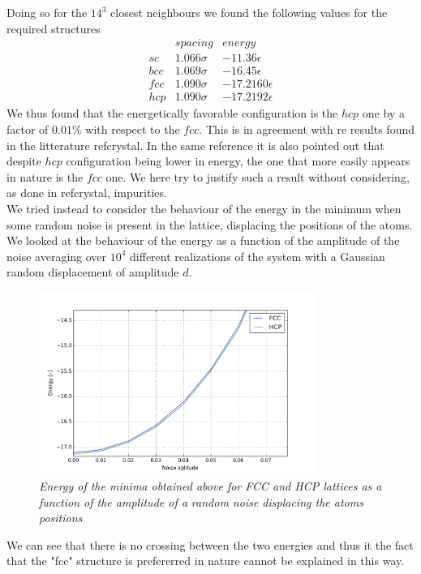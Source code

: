 \documentclass[a4paper]{article}
\begin{document}
Doing so for the $14^3$ closest neighbours we found the following values for the required structures
\begin{eqnarray*}
&spacing&energy\\
sc&1.066\sigma&-11.36\epsilon\\
bcc&1.069\sigma&-16.45\epsilon\\
fcc&1.090\sigma&-17.2160\epsilon\\
hcp&1.090\sigma&-17.2192\epsilon
\end{eqnarray*}
We thus found that the energetically favorable configuration is the $hcp$ one by a factor of $0.01\%$ with respect to the $fcc$.
This is in agreement with re results found in the litterature ref{crystal}. 
In the same reference it is also pointed out that despite $hcp$ configuration being lower in energy, the one that more easily appears in nature is the $fcc$ one.
We here try to justify such a result without considering, as done in ref{crystal}, impurities.\\
We tried instead to consider the behaviour of the energy in the minimum when some random noise is present in the lattice, displacing the positions of the atoms.
We looked at the behaviour of the energy as a function of the amplitude of the noise averaging over $10^4$ different realizations of the system with a Gaussian random displacement of amplitude $d$.

\begin{figure}[ht]
    \centering
    \includegraphics[width=9cm]{energy_noise.png}
    \caption{\it \label{noise}Energy of the minima obtained above for FCC and HCP lattices as a function of the amplitude of a random noise displacing the atoms positions}
    \end{figure}

We can see that there is no crossing between the two energies and thus it the fact that the "fcc" structure is prefererred in nature cannot be explained in this way.
\end{document}
